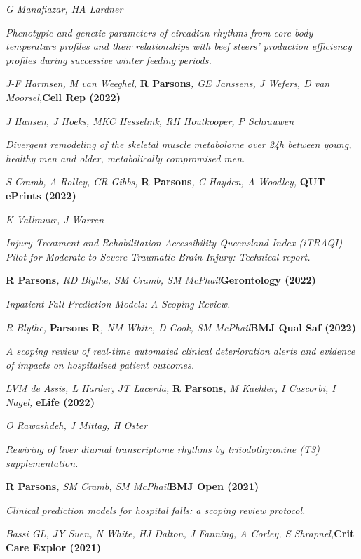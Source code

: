	\textit{G Manafiazar, HA Lardner}\par
    \textit{Phenotypic and genetic parameters of circadian rhythms from core body temperature profiles and their relationships with beef steers’ production efficiency profiles during successive winter feeding periods.}
\item
    \textit{J-F Harmsen, M van Weeghel, }\textbf{R Parsons}\textit{, GE Janssens, J Wefers, D van Moorsel,}\textbf{\hfill{Cell Rep (2022)}}\par
	\textit{J Hansen, J Hoeks, MKC Hesselink, RH Houtkooper, P Schrauwen}\par
    \textit{Divergent remodeling of the skeletal muscle metabolome over 24h between young, healthy men and older, metabolically compromised men.}
\item
    \textit{S Cramb, A Rolley, CR Gibbs, }\textbf{R Parsons}\textit{, C Hayden, A Woodley, }\textbf{\hfill{QUT ePrints (2022)}}\par
	\textit{K Vallmuur, J Warren}\par
	\textit{Injury Treatment and Rehabilitation Accessibility Queensland Index (iTRAQI) Pilot for Moderate-to-Severe Traumatic Brain Injury: Technical report.}
\item
    \textbf{R Parsons}\textit{, RD Blythe, SM Cramb, SM McPhail}\textbf{\hfill Gerontology (2022)}\par
	\textit{Inpatient Fall Prediction Models: A Scoping Review.}
\item
	\textit{R Blythe, }\textbf{Parsons R}\textit{, NM White, D Cook, SM McPhail}\textbf{\hfill{BMJ Qual Saf (2022)}}\par
	\textit{A scoping review of real-time automated clinical deterioration alerts and evidence of impacts on hospitalised patient outcomes.}
\item
	\textit{LVM de Assis, L Harder, JT Lacerda, }\textbf{R Parsons}\textit{, M Kaehler, I Cascorbi, I Nagel, }\textbf{\hfill eLife (2022)}\par
	\textit{O Rawashdeh, J Mittag, H Oster}\par
    \textit{Rewiring of liver diurnal transcriptome rhythms by triiodothyronine (T3) supplementation.}
\item
    \textbf{R Parsons}\textit{, SM Cramb, SM McPhail}\textbf{\hfill BMJ Open (2021)}\par 
    \textit{Clinical prediction models for hospital falls: a scoping review protocol.}
\item
    \textit{Bassi GL, JY Suen, N White, HJ Dalton, J Fanning, A Corley, S Shrapnel,}\textbf{\hfill Crit Care Explor (2021)}\par
